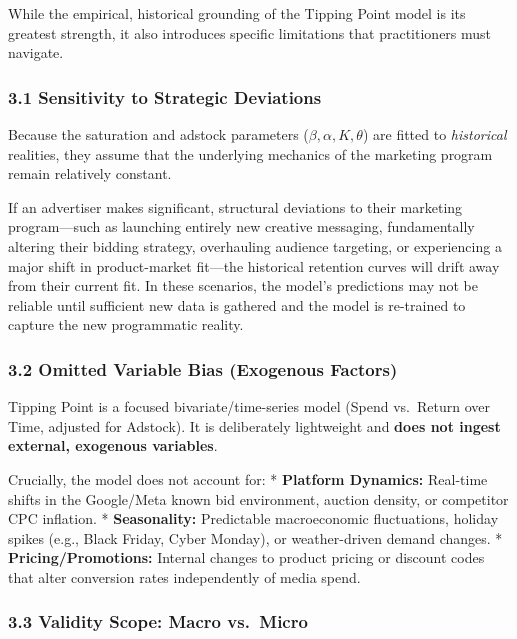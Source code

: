 \documentclass[
]{article}
\begin{document}
While the empirical, historical grounding of the Tipping Point model is
its greatest strength, it also introduces specific limitations that
practitioners must navigate.

\subsubsection{3.1 Sensitivity to Strategic
Deviations}\label{sensitivity-to-strategic-deviations}

Because the saturation and adstock parameters
(\(\beta, \alpha, K, \theta\)) are fitted to \emph{historical}
realities, they assume that the underlying mechanics of the marketing
program remain relatively constant.

If an advertiser makes significant, structural deviations to their
marketing program---such as launching entirely new creative messaging,
fundamentally altering their bidding strategy, overhauling audience
targeting, or experiencing a major shift in product-market fit---the
historical retention curves will drift away from their current fit. In
these scenarios, the model's predictions may not be reliable until
sufficient new data is gathered and the model is re-trained to capture
the new programmatic reality.

\subsubsection{3.2 Omitted Variable Bias (Exogenous
Factors)}\label{omitted-variable-bias-exogenous-factors}

Tipping Point is a focused bivariate/time-series model (Spend vs.~Return
over Time, adjusted for Adstock). It is deliberately lightweight and
\textbf{does not ingest external, exogenous variables}.

Crucially, the model does not account for: * \textbf{Platform Dynamics:}
Real-time shifts in the Google/Meta known bid environment, auction
density, or competitor CPC inflation. * \textbf{Seasonality:}
Predictable macroeconomic fluctuations, holiday spikes (e.g., Black
Friday, Cyber Monday), or weather-driven demand changes. *
\textbf{Pricing/Promotions:} Internal changes to product pricing or
discount codes that alter conversion rates independently of media spend.

\subsubsection{3.3 Validity Scope: Macro
vs.~Micro}\label{validity-scope-macro-vs.-micro}
\end{document}

